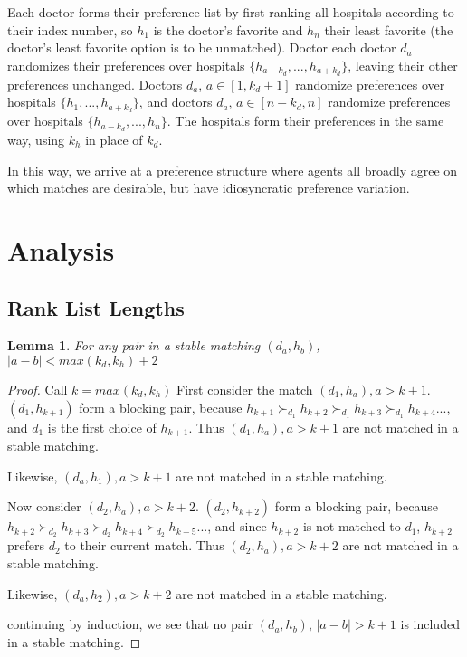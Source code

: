 \documentclass[WP]{AEA}
\newtheorem{lemma}{Lemma}
\begin{document}
Each doctor forms their preference list by first ranking all hospitals according to their index number, so $h_1$ is the doctor's favorite and $h_n$ their least favorite (the doctor's least favorite option is to be unmatched).  
Doctor each doctor $d_a$ randomizes their preferences over hospitals $\{h_{a-k_d},...,h_{a+k_d}\}$, leaving their other preferences unchanged.  Doctors $d_a$, $a \in [1,k_d+1]$ randomize preferences over hospitals  $\{h_{1},...,h_{a+k_d}\}$, and doctors $d_a$, $a \in [n-k_d,n]$ randomize preferences over hospitals  $\{h_{a-k_d},...,h_{n}\}$.  
The hospitals form their preferences in the same way, using $k_h$ in place of $k_d$.

In this way, we arrive at a preference structure where agents all broadly agree on which matches are desirable, but have idiosyncratic preference variation.

\section{Analysis}

\subsection{Rank List Lengths}
\begin{lemma}
	For any pair in a stable matching $(d_a,h_b)$, $|a-b| < max(k_d,k_h)+2$
\end{lemma}
\begin{proof}
	Call $k = max(k_d,k_h)$
	First consider the match $(d_1,h_a), a > k+1$.  $(d_1,h_{k+1})$ form a blocking pair, because $h_{k+1} \succ_{d_1} h_{k+2} \succ_{d_1} h_{k+3} \succ_{d_1} h_{k+4}...$, and $d_1$ is the first choice of $h_{k+1}$.  Thus $(d_1,h_a), a > k+1$ are not matched in a stable matching.
	
	Likewise, $(d_a,h_1), a > k+1$ are not matched in a stable matching.

	Now consider $(d_2,h_a), a > k+2$.  $(d_2,h_{k+2})$ form a blocking pair, because $h_{k+2} \succ_{d_2} h_{k+3} \succ_{d_2} h_{k+4} \succ_{d_2} h_{k+5}...$, and since $h_{k+2}$ is not matched to $d_1$,  $h_{k+2}$ prefers $d_2$ to their current match.  Thus $(d_2,h_a), a > k+2$ are not matched in a stable matching.

	Likewise, $(d_a,h_2), a > k+2$ are not matched in a stable matching.

	continuing by induction, we see that no pair $(d_a,h_b)$, $|a-b| > k+1$ is included in a stable matching.

\end{proof}
\end{document}

